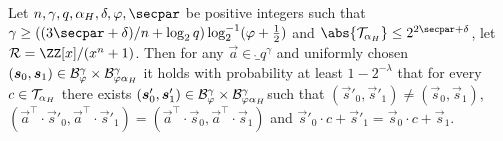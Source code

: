\begin{lemma}\label{lem:keyhidden}
  Let $n,\gamma,q,\alpha_H, \delta, \varphi,\secpar$ be positive integers such that $\gamma\geq((3\secpar+\delta)/n+\log_2q)\log^{-1}_2(\varphi+\tfrac{1}{2})$ and $\abs{\tern_{\alpha_H}} \leq 2^{2\secpar + \delta}$, let $\ring=\ZZ[x]/(x^n+1)$. Then for any $\vec{a}\in\ring_q^\gamma$ and uniformly chosen $(\boldsymbol{s}_0,\boldsymbol{s}_1)\in \mathcal{B}_{\varphi}^\gamma \times \mathcal{B}_{\varphi\alpha_H}^\gamma$ it holds with probability at least $1-2^{-\lambda}$ that for every $c\in \mathcal{T}_{\alpha_H}$ there exists $(\boldsymbol{s}'_0,\boldsymbol{s}'_1)\in \mathcal{B}_{\varphi}^\gamma \times \mathcal{B}_{\varphi\alpha_H}^\gamma$such that $(\vec{s}'_0,\vec{s}'_1)\neq(\vec{s}_0,\vec{s}_1)$, $(\vec{a}^\intercal\cdot\vec{s}'_0,\vec{a}^\intercal\cdot\vec{s}'_1) = (\vec{a}^\intercal\cdot\vec{s}_0,\vec{a}^\intercal\cdot\vec{s}_1)$ and $\vec{s}'_0\cdot c + \vec{s}'_1 = \vec{s}_0\cdot c + \vec{s}_1$.
\end{lemma}
